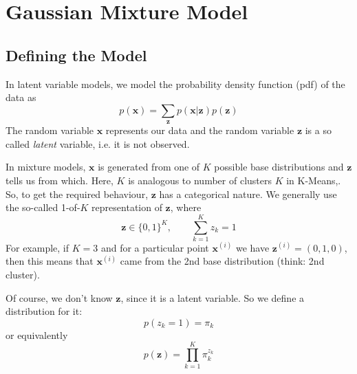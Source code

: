 \documentclass[final,3p,times]{elsarticle}
\begin{document}

\section{Gaussian Mixture Model}
\label{sect:GMM}

\subsection*{Defining the Model}
\label{sect:GMM-def}
In latent variable models, we model the probability density function (pdf) of the data as 
\begin{equation}
p(\boldsymbol{x}) = \sum_{\boldsymbol{z}} p(\boldsymbol{x}|\boldsymbol{z})p(\boldsymbol{z})
\label{eqn:mixtures}
\end{equation}
The random variable $\boldsymbol{x}$ represents our data and the random variable $\boldsymbol{z}$ is a so called \emph{latent} variable, i.e. it is not observed.

In mixture models, $\boldsymbol{x}$ is generated from one of $K$ possible base distributions and $\boldsymbol{z}$ tells us from which. Here, $K$ is analogous to number of clusters $K$ in K-Means,. So, to get the required behaviour, $\boldsymbol{z}$ has a categorical nature. We generally use the so-called 1-of-$K$ representation of $\boldsymbol{z}$, where 
\begin{equation}
\boldsymbol{z} \in \{0,1\}^K, \qquad \sum_{k=1}^K z_k = 1
\label{eqn:1-of-K}
\end{equation}
For example, if $K=3$ and for a particular point $\boldsymbol{x}^{(i)}$ we have $\boldsymbol{z}^{(i)} = (0,1,0)$, then this means that $\boldsymbol{x}^{(i)}$ came from the 2nd base distribution (think: 2nd cluster).

Of course, we don't know $\boldsymbol{z}$, since it is a latent variable. So we define a distribution for it: 
\begin{equation}
p(z_k = 1) = \pi_k
\end{equation}
or equivalently
\begin{equation}
p(\boldsymbol{z}) = \prod_{k=1}^K \pi_k^{z_k}
\end{equation} 
\end{document}
